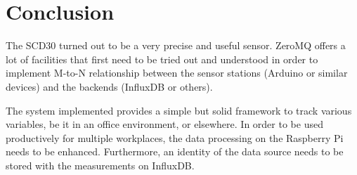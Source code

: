 \section{Conclusion}

The SCD30 turned out to be a very precise and useful sensor. ZeroMQ offers a lot of facilities that first need to be tried out and understood in order to implement M-to-N relationship between the sensor stations (Arduino or similar devices) and the backends (InfluxDB or others).

The system implemented provides a simple but solid framework to track various variables, be it in an office environment, or elsewhere. In order to be used productively for multiple workplaces, the data processing on the Raspberry Pi needs to be enhanced. Furthermore, an identity of the data source needs to be stored with the measurements on InfluxDB.

